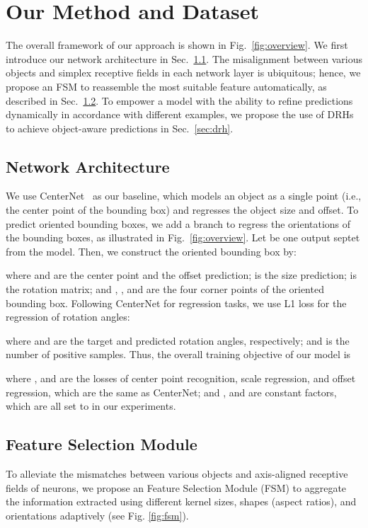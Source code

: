 \documentclass[10pt,twocolumn,letterpaper]{article}
\begin{document}
\section{Our Method and Dataset}
\label{sec:drn}
The overall framework of our approach is shown in Fig.~\ref{fig:overview}.
We first introduce our network architecture in Sec.~\ref{sec:na}. The misalignment between various objects and simplex receptive fields in each network layer is ubiquitous; hence, we propose an FSM to reassemble the most suitable feature automatically, as described in Sec.~\ref{sec:fsm}.
To empower a model with the ability to refine predictions dynamically in accordance with different examples, we propose the use of DRHs to achieve object-aware predictions in Sec.~\ref{sec:drh}.

\subsection{Network Architecture}
\label{sec:na}
We use CenterNet~\cite{zhou2019objects} as our baseline, which models an object as a single point (i.e., the center point of the bounding box) and regresses the object size and offset.
To predict oriented bounding boxes, we add a branch to regress the orientations of the bounding boxes, as illustrated in Fig.~\ref{fig:overview}.
Let  be one output septet from the model.
Then, we construct the oriented bounding box by:

where  and  are the center point and the offset prediction;  is the size prediction;  is the rotation matrix; and , ,  and  are the four corner points of the oriented bounding box.
Following CenterNet for regression tasks, we use L1 loss for the regression of rotation angles:

where  and  are the target and predicted rotation angles, respectively; and  is the number of positive samples. Thus, the overall training objective of our model is

where ,  and  are the losses of center point recognition, scale regression, and offset regression, which are the same as CenterNet; and ,  and  are constant factors, which are all set to  in our experiments.

\subsection{Feature Selection Module}
\label{sec:fsm}
To alleviate the mismatches between various objects and axis-aligned receptive fields of neurons, we propose an Feature Selection Module (FSM) to aggregate the information extracted using different kernel sizes, shapes (aspect ratios), and orientations adaptively (see Fig. \ref{fig:fsm}).
\end{document}
